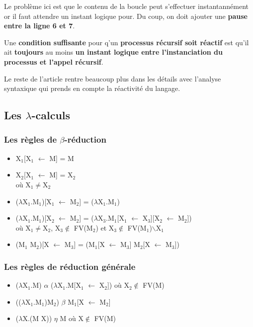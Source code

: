 \documentclass[10pt,a4paper]{article}
\begin{document}
				Le probl\`{e}me ici est que le contenu de la boucle peut s'effectuer instantann\'{e}ment or il faut attendre un instant logique pour. Du coup, on doit ajouter une \textbf{pause entre la ligne 6 et 7}.
				\bigbreak
				
				Une \textbf{condition suffisante} pour q'un \textbf{processus r\'{e}cursif soit r\'{e}actif} est qu'il ait \textbf{toujours} au moins \textbf{un instant logique entre l'instanciation du processus et l'appel r\'{e}cursif}.
				\bigbreak
				
				Le reste de l'article rentre beaucoup plus dans les détails avec l'analyse syntaxique qui prends en compte la réactivité du langage.
		
			\newpage
			
			\subsection{Les  $\lambda$-calculs}
				
				\subsubsection{Les règles de $\beta$-réduction}
					\begin{itemize}
						\item X$_{1}$[X$_{1}$ $\leftarrow$ M] = M
						\item X$_{2}$[X$_{1}$ $\leftarrow$ M] = X$_{2}$ 
						\\où X$_{1}$$\neq$X$_{2}$
						\item ($\lambda$X$_{1}$.M$_{1}$)[X$_{1}$ $\leftarrow$ M$_{2}$] =  ($\lambda$X$_{1}$.M$_{1}$)
						\item ($\lambda$X$_{1}$.M$_{1}$)[X$_{2}$ $\leftarrow$ M$_{2}$] = ($\lambda$X$_{3}$.M$_{1}$[X$_{1}$ $\leftarrow$ X$_{3}$][X$_{2}$ $\leftarrow$ M$_{2}$]) 
						\\où X$_{1}$$\neq$X$_{2}$, X$_{3}$$\notin$ FV(M$_{2}$) 
						et X$_{3}$$\notin$ FV(M$_{1}$)$\backslash${X$_{1}$} 
						\item (M$_{1}$ M$_{2}$)[X $\leftarrow$ M$_{3}$] = 
						(M$_{1}$[X $\leftarrow$ M$_{3}$] M$_{2}$[X $\leftarrow$ M$_{3}$])
					\end{itemize}
			
				\subsubsection{Les règles de réduction générale}
					\begin{itemize}
						\item ($\lambda$X$_{1}$.M) $\alpha$ ($\lambda$X$_{1}$.M[X$_{1}$ $\leftarrow$ X$_{2}$])
						où X$_{2}$$\notin$  FV(M)
						\item (($\lambda$X$_{1}$.M$_{1}$)M$_{2}$) $\beta$ M$_{1}$[X $\leftarrow$ M$_{2}$]
						\item ($\lambda$X.(M X)) $\eta$ M 
						où X$\notin$  FV(M)
					\end{itemize}
				
\end{document}
